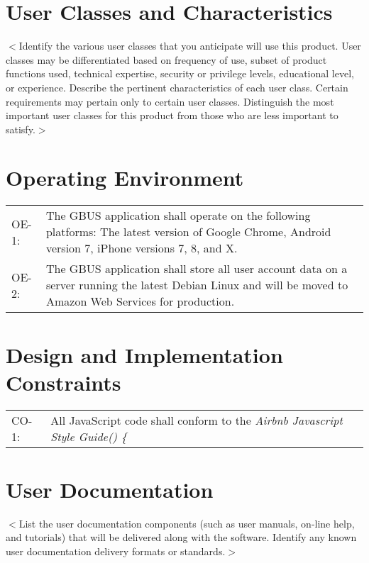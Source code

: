 \documentclass{scrreprt}
\begin{document}
\section{User Classes and Characteristics}
$<$Identify the various user classes that you anticipate will use this product.
User classes may be differentiated based on frequency of use, subset of product
functions used, technical expertise, security or privilege levels, educational
level, or experience. Describe the pertinent characteristics of each user class.
Certain requirements may pertain only to certain user classes. Distinguish the
most important user classes for this product from those who are less important
to satisfy.$>$

\section{Operating Environment}
\begin{center}
\begin{longtable}{ p{1cm} p{14cm} }
OE-1: & The GBUS application shall operate on the following platforms: The latest version of Google Chrome, Android version 7, iPhone versions 7, 8, and X. \\
OE-2: & The GBUS application shall store all user account data on a server running the latest Debian Linux and will be moved to Amazon Web Services for production. \\
\end{longtable}
\end{center}

\section{Design and Implementation Constraints}
\begin{center}
\begin{longtable}{ p{2cm} p{13cm} }
CO-1: & All JavaScript code shall conform to the \textit{Airbnb Javascript Style Guide() \{} \\
\end{longtable}
\end{center}

\section{User Documentation}
$<$List the user documentation components (such as user manuals, on-line help,
and tutorials) that will be delivered along with the software. Identify any
known user documentation delivery formats or standards.$>$
\end{document}

